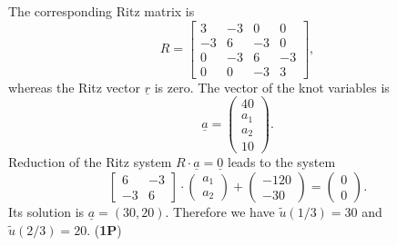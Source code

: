 \begin{loesung}
\begin{teilaufgaben}
\item
The corresponding Ritz matrix is
\[
R
=
\left[\begin{array}{rrrr}
3 & -3 & 0 & 0 \\
-3 & 6 & - 3 & 0 \\
0 & -3 & 6 & -3 \\
0 & 0 & -3 & 3
\end{array}\right],
\tag{\bf 1P}
\]
whereas the Ritz vector $\underline{r}$ is  zero.
The vector of the knot variables is
\[
\underline{a}
=
\left(\begin{array}{r} 40 \\ a_1 \\ a_2 \\ 10 \end{array}\right).
\]
Reduction of the Ritz system
$R \cdot  \underline{a} = \underline{0}$ leads to the system 
\[
\left[\begin{array}{rr}  6 & - 3  \\  -3 & 6  \end{array}\right]
\cdot
\left(\begin{array}{r} a_1 \\ a_2 \end{array}\right)
+
\left(\begin{array}{r} -120 \\ -30 \end{array}\right)
=
\left(\begin{array}{r} 0 \\0 \end{array}\right).
\]
Its solution is $\underline{a} = (30, 20)$.
Therefore we have $\tilde u(1/3) = 30$ and
$\tilde u(2/3) = 20.$
\hfill{({\bf 1P})}


\end{teilaufgaben}
\end{loesung}
